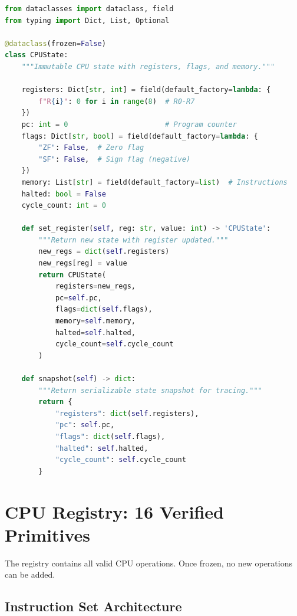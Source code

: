 \documentclass[11pt,a4paper]{article}
\begin{document}
\begin{lstlisting}[language=Python, caption={state.py - CPUState Definition}]
from dataclasses import dataclass, field
from typing import Dict, List, Optional

@dataclass(frozen=False)
class CPUState:
    """Immutable CPU state with registers, flags, and memory."""

    registers: Dict[str, int] = field(default_factory=lambda: {
        f"R{i}": 0 for i in range(8)  # R0-R7
    })
    pc: int = 0                       # Program counter
    flags: Dict[str, bool] = field(default_factory=lambda: {
        "ZF": False,  # Zero flag
        "SF": False,  # Sign flag (negative)
    })
    memory: List[str] = field(default_factory=list)  # Instructions
    halted: bool = False
    cycle_count: int = 0

    def set_register(self, reg: str, value: int) -> 'CPUState':
        """Return new state with register updated."""
        new_regs = dict(self.registers)
        new_regs[reg] = value
        return CPUState(
            registers=new_regs,
            pc=self.pc,
            flags=dict(self.flags),
            memory=self.memory,
            halted=self.halted,
            cycle_count=self.cycle_count
        )

    def snapshot(self) -> dict:
        """Return serializable state snapshot for tracing."""
        return {
            "registers": dict(self.registers),
            "pc": self.pc,
            "flags": dict(self.flags),
            "halted": self.halted,
            "cycle_count": self.cycle_count
        }
\end{lstlisting}

\section{CPU Registry: 16 Verified Primitives}

The registry contains all valid CPU operations. Once frozen, no new operations can be added.

\subsection{Instruction Set Architecture}
\end{document}

